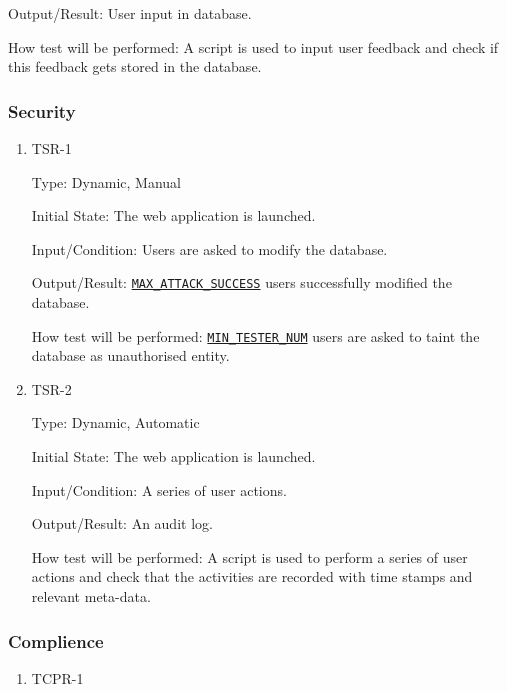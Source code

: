 \documentclass[12pt, titlepage]{article}
\begin{document}
\begin{enumerate}
\begin{enumerate}
Output/Result: User input in database.
					
How test will be performed: A script is used to input user feedback and check if this feedback gets stored in the database.

\end{enumerate}

\subsubsection{Security}

\begin{enumerate}

\item{TSR-1\\}\label{TSR-3}

Type: Dynamic, Manual
					
Initial State: The web application is launched.
					
Input/Condition: Users are asked to modify the database.
					
Output/Result: \hyperref[MAX_ATTACK_SUCCESS]{\texttt{MAX\_ATTACK\_SUCCESS}} users successfully modified the database.
					
How test will be performed: \hyperref[MIN_TESTER_NUM]{\texttt{MIN\_TESTER\_NUM}} users are asked to taint the database as unauthorised entity.

\item{TSR-2\\}\label{TSR-4}

Type: Dynamic, Automatic
					
Initial State: The web application is launched.
					
Input/Condition: A series of user actions.
					
Output/Result: An audit log.
					
How test will be performed: A script is used to perform a series of user actions and check that the activities are recorded with time stamps and relevant meta-data.

\end{enumerate}

\subsubsection{Complience}

\begin{enumerate}
\item{TCPR-1\\}\label{TCPR-1}


\end{enumerate}
\end{enumerate}
\end{document}

